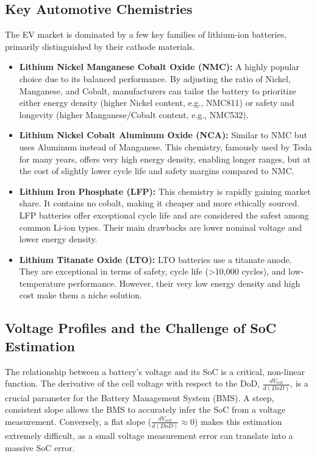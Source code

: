 \subsection{Key Automotive Chemistries}
The EV market is dominated by a few key families of lithium-ion batteries, primarily distinguished by their cathode materials.

\begin{itemize}
    \item \textbf{Lithium Nickel Manganese Cobalt Oxide (NMC):} A highly popular choice due to its balanced performance. By adjusting the ratio of Nickel, Manganese, and Cobalt, manufacturers can tailor the battery to prioritize either energy density (higher Nickel content, e.g., NMC811) or safety and longevity (higher Manganese/Cobalt content, e.g., NMC532).
    \item \textbf{Lithium Nickel Cobalt Aluminum Oxide (NCA):} Similar to NMC but uses Aluminum instead of Manganese. This chemistry, famously used by Tesla for many years, offers very high energy density, enabling longer ranges, but at the cost of slightly lower cycle life and safety margins compared to NMC.
    \item \textbf{Lithium Iron Phosphate (LFP):} This chemistry is rapidly gaining market share. It contains no cobalt, making it cheaper and more ethically sourced. LFP batteries offer exceptional cycle life and are considered the safest among common Li-ion types. Their main drawbacks are lower nominal voltage and lower energy density.
    \item \textbf{Lithium Titanate Oxide (LTO):} LTO batteries use a titanate anode. They are exceptional in terms of safety, cycle life (>10,000 cycles), and low-temperature performance. However, their very low energy density and high cost make them a niche solution.
\end{itemize}

\subsection{Voltage Profiles and the Challenge of SoC Estimation}
The relationship between a battery's voltage and its SoC is a critical, non-linear function. The derivative of the cell voltage with respect to the DoD, $\frac{dV_{cell}}{d(DoD)}$, is a crucial parameter for the Battery Management System (BMS). A steep, consistent slope allows the BMS to accurately infer the SoC from a voltage measurement. Conversely, a flat slope ($\frac{dV_{cell}}{d(DoD)} \approx 0$) makes this estimation extremely difficult, as a small voltage measurement error can translate into a massive SoC error.

